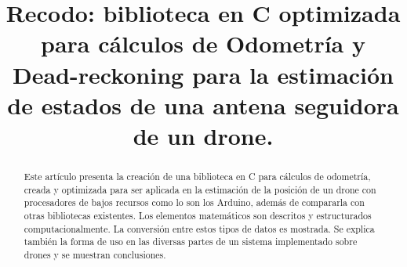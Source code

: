 \documentclass[conference]{IEEEtran}
\begin{document}
%
\title{
  Recodo: biblioteca en C optimizada para cálculos de
  Odometría y Dead-reckoning para la estimación de estados
  de una antena seguidora de un drone.
}


\author{
  \and
}



\maketitle



\begin{abstract}
Este artículo presenta la creación de una biblioteca en C para cálculos
de odometría, creada y optimizada para ser aplicada en la estimación de
la posición de un drone con procesadores de bajos recursos como lo son
los Arduino, además de compararla con otras bibliotecas existentes. Los
elementos matemáticos son descritos y estructurados computacionalmente.
La conversión entre estos tipos de datos es mostrada. Se explica también
la forma de uso en las diversas partes de un sistema implementado sobre
drones y se muestran conclusiones.
\end{abstract}


%
\IEEEpeerreviewmaketitle
\end{document}
